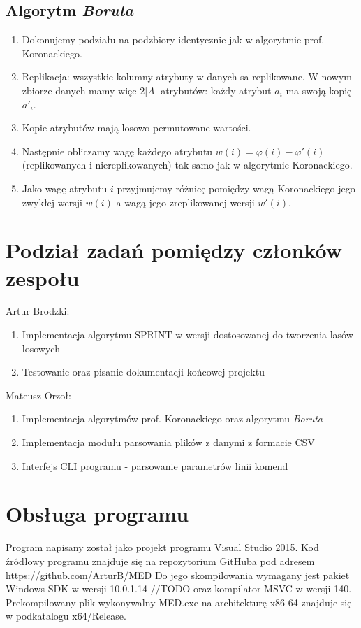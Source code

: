 \documentclass{article}
\begin{document}
\subsection{Algorytm \emph{Boruta}}
\begin{enumerate}
	\item Dokonujemy podziału na podzbiory identycznie jak w algorytmie prof. Koronackiego. 
	\item Replikacja: wszystkie kolumny-atrybuty w danych sa replikowane. W	nowym zbiorze danych mamy więc $2\left|A\right|$ atrybutów: każdy atrybut $a_i$ ma swoją kopię $a'_i$. 
	\item Kopie atrybutów mają losowo permutowane wartości. 
	\item Następnie obliczamy wagę każdego atrybutu $w(i) = \varphi(i) − \varphi'(i)$ (replikowanych i niereplikowanych) tak samo jak w algorytmie Koronackiego. 
	\item  Jako wagę atrybutu $i$ przyjmujemy różnicę pomiędzy wagą Koronackiego jego zwykłej wersji $w(i)$ a wagą jego zreplikowanej wersji $w'(i)$.
\end{enumerate}

\section{Podział zadań pomiędzy członków zespołu}

Artur Brodzki:
\begin{enumerate}
	\item Implementacja algorytmu SPRINT w wersji dostosowanej do tworzenia lasów losowych
	\item Testowanie oraz pisanie dokumentacji końcowej projektu
\end{enumerate}
Mateusz Orzoł:
\begin{enumerate}
	\item Implementacja algorytmów prof. Koronackiego oraz algorytmu \emph{Boruta}
	\item Implementacja modułu parsowania plików z danymi z formacie CSV
	\item Interfejs CLI programu - parsowanie parametrów linii komend
\end{enumerate}

\section{Obsługa programu}

Program napisany został jako projekt programu Visual Studio 2015. Kod źródłowy programu znajduje się na repozytorium GitHuba pod adresem \url{https://github.com/ArturB/MED} Do jego skompilowania wymagany jest pakiet Windows SDK w wersji 10.0.1.14 //TODO oraz kompilator MSVC w wersji 140. Prekompilowany plik wykonywalny MED.exe na architekturę x86-64 znajduje się w podkatalogu x64/Release. 
\end{document}
